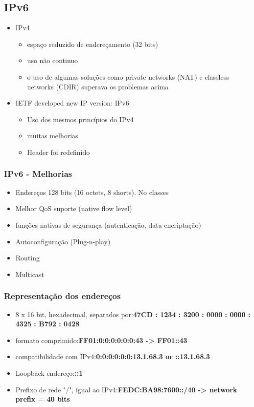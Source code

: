 \documentclass[../resumosRCOM.tex]{subfiles}
\begin{document}
\subsection{IPv6}
\begin{itemize}
    \item IPv4
    \begin{itemize}
        \item espaço reduzido de endereçamento (32 bits)
        \item uso não continuo
        \item o uso de algumas soluções como private networks (NAT) e classless networks (CDIR) superava os problemas acima
    \end{itemize}
    \item IETF developed new IP version: IPv6
    \begin{itemize}
        \item Uso dos mesmos princípios do IPv4
        \item muitas melhorias
        \item Header foi redefinido
    \end{itemize}
\end{itemize}

\subsubsection{IPv6 - Melhorias}
\begin{itemize}
    \item Endereços 128 bits (16 octets, 8 shorts). No classes
    \item Melhor QoS suporte (native flow level)
    \item funções nativas de segurança (autenticação, data encriptação)
    \item Autoconfiguração (Plug-n-play)
    \item Routing
    \item Multicast
\end{itemize}

\subsubsection{Representação dos endereços}
\begin{itemize}
    \item 8 x 16 bit, hexadecimal, separados por:\newline \textbf{47CD : 1234 : 3200 : 0000 : 0000 : 4325 : B792 : 0428}
    \item formato comprimido:\newline \textbf{FF01:0:0:0:0:0:0:43 -> FF01::43}
    \item compatibilidade com IPv4:\newline \textbf{0:0:0:0:0:0:13.1.68.3 or ::13.1.68.3}
    \item Loopback endereço:\newline \textbf{::1}
    \item Prefixo de rede "/", igual ao IPv4:\newline \textbf{FEDC:BA98:7600::/40 -> network prefix = 40 bits}
\end{itemize}
\end{document}
